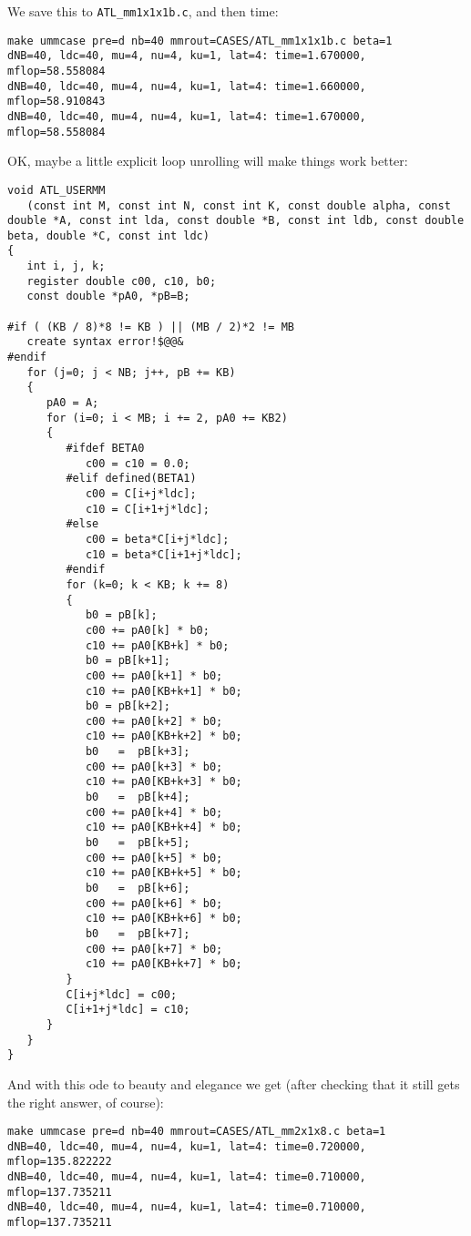 \documentclass[11pt]{article}
\begin{document}
We save this to {\tt ATL\_mm1x1x1b.c}, and then time:
\begin{verbatim}
make ummcase pre=d nb=40 mmrout=CASES/ATL_mm1x1x1b.c beta=1
dNB=40, ldc=40, mu=4, nu=4, ku=1, lat=4: time=1.670000, mflop=58.558084
dNB=40, ldc=40, mu=4, nu=4, ku=1, lat=4: time=1.660000, mflop=58.910843
dNB=40, ldc=40, mu=4, nu=4, ku=1, lat=4: time=1.670000, mflop=58.558084
\end{verbatim}

OK, maybe a little explicit loop unrolling will make things work better:
\begin{verbatim}
void ATL_USERMM
   (const int M, const int N, const int K, const double alpha, const double *A, const int lda, const double *B, const int ldb, const double beta, double *C, const int ldc)
{
   int i, j, k;
   register double c00, c10, b0;
   const double *pA0, *pB=B;

#if ( (KB / 8)*8 != KB ) || (MB / 2)*2 != MB
   create syntax error!$@@&
#endif
   for (j=0; j < NB; j++, pB += KB)
   {
      pA0 = A;
      for (i=0; i < MB; i += 2, pA0 += KB2)
      {
         #ifdef BETA0
            c00 = c10 = 0.0;
         #elif defined(BETA1)
            c00 = C[i+j*ldc];
            c10 = C[i+1+j*ldc];
         #else
            c00 = beta*C[i+j*ldc];
            c10 = beta*C[i+1+j*ldc];
         #endif
         for (k=0; k < KB; k += 8)
         {
            b0 = pB[k];
            c00 += pA0[k] * b0;
            c10 += pA0[KB+k] * b0;
            b0 = pB[k+1];
            c00 += pA0[k+1] * b0;
            c10 += pA0[KB+k+1] * b0;
            b0 = pB[k+2];
            c00 += pA0[k+2] * b0;
            c10 += pA0[KB+k+2] * b0;
            b0   =  pB[k+3];
            c00 += pA0[k+3] * b0;
            c10 += pA0[KB+k+3] * b0;
            b0   =  pB[k+4];
            c00 += pA0[k+4] * b0;
            c10 += pA0[KB+k+4] * b0;
            b0   =  pB[k+5];
            c00 += pA0[k+5] * b0;
            c10 += pA0[KB+k+5] * b0;
            b0   =  pB[k+6];
            c00 += pA0[k+6] * b0;
            c10 += pA0[KB+k+6] * b0;
            b0   =  pB[k+7];
            c00 += pA0[k+7] * b0;
            c10 += pA0[KB+k+7] * b0;
         }
         C[i+j*ldc] = c00;
         C[i+1+j*ldc] = c10;
      }
   }
}
\end{verbatim}

And with this ode to beauty and elegance we get (after checking that it
still gets the right answer, of course):
\begin{verbatim}
make ummcase pre=d nb=40 mmrout=CASES/ATL_mm2x1x8.c beta=1
dNB=40, ldc=40, mu=4, nu=4, ku=1, lat=4: time=0.720000, mflop=135.822222
dNB=40, ldc=40, mu=4, nu=4, ku=1, lat=4: time=0.710000, mflop=137.735211
dNB=40, ldc=40, mu=4, nu=4, ku=1, lat=4: time=0.710000, mflop=137.735211
\end{verbatim}
\end{document}
